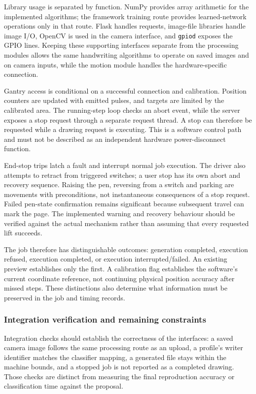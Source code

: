 Library usage is separated by function. NumPy provides array arithmetic for the implemented algorithms; the framework training route provides learned-network operations only in that route. Flask handles requests, image-file libraries handle image I/O, OpenCV is used in the camera interface, and \texttt{gpiod} exposes the GPIO lines. Keeping these supporting interfaces separate from the processing modules allows the same handwriting algorithms to operate on saved images and on camera inputs, while the motion module handles the hardware-specific connection.

Gantry access is conditional on a successful connection and calibration. Position counters are updated with emitted pulses, and targets are limited by the calibrated area. The running-step loop checks an abort event, while the server exposes a stop request through a separate request thread. A stop can therefore be requested while a drawing request is executing. This is a software control path and must not be described as an independent hardware power-disconnect function.

End-stop trips latch a fault and interrupt normal job execution. The driver also attempts to retract from triggered switches; a user stop has its own abort and recovery sequence. Raising the pen, reversing from a switch and parking are movements with preconditions, not instantaneous consequences of a stop request. Failed pen-state confirmation remains significant because subsequent travel can mark the page. The implemented warning and recovery behaviour should be verified against the actual mechanism rather than assuming that every requested lift succeeds.

The job therefore has distinguishable outcomes: generation completed, execution refused, execution completed, or execution interrupted/failed. An existing preview establishes only the first. A calibration flag establishes the software's current coordinate reference, not continuing physical position accuracy after missed steps. These distinctions also determine what information must be preserved in the job and timing records.

\subsubsection{Integration verification and remaining constraints}
Integration checks should establish the correctness of the interfaces: a saved camera image follows the same processing route as an upload, a profile's writer identifier matches the classifier mapping, a generated file stays within the machine bounds, and a stopped job is not reported as a completed drawing. Those checks are distinct from measuring the final reproduction accuracy or classification time against the proposal.


